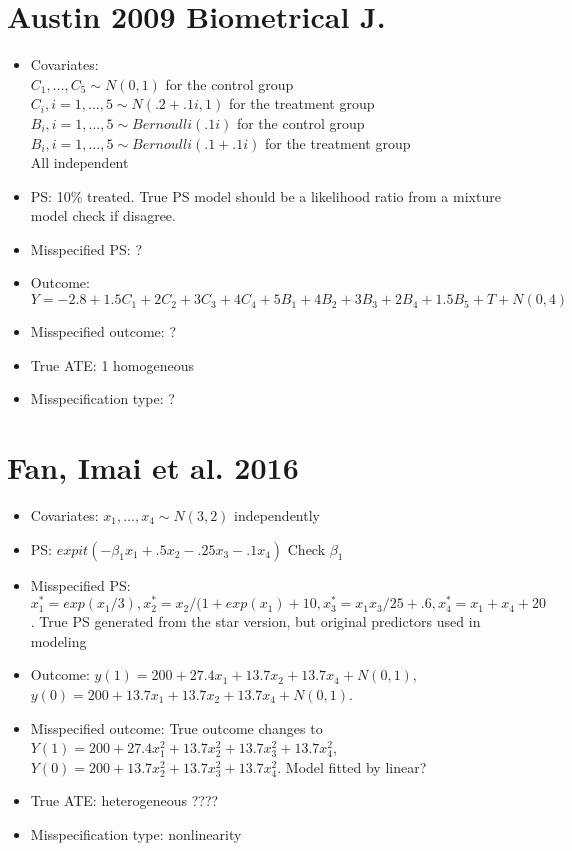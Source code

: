 \documentclass{article}
\begin{document}
\section{Austin 2009 Biometrical J.}
\begin{itemize}
\item Covariates:\\
$C_1, \ldots, C_5 \sim N(0, 1)$ for the control group\\
$C_i, i=1,\ldots,5 \sim N(.2+.1i, 1)$ for the treatment group\\
$B_i, i=1,\ldots,5 \sim Bernoulli(.1i)$ for the control group\\
$B_i, i=1,\ldots,5 \sim Bernoulli(.1 + .1i)$ for the treatment group\\
All independent
\item PS:  10\% treated. True PS model should be a likelihood ratio from a mixture model {\color{red} check if disagree}.
\item Misspecified PS: {\color{red} ?}
\item Outcome: $Y=-2.8 +  1.5C_1 + 2C_2 +3C_3 +4C_4 +5B_1 +4B_2 + 3B_3 + 2B_4 +1.5B_5 + T + N(0, 4)$
\item Misspecified outcome:  {\color{red} ?}
\item True ATE: 1 homogeneous 
\item Misspecification type:   {\color{red} ?}
\end{itemize}

\section{Fan, Imai et al. 2016}
\begin{itemize}
\item Covariates: $x_1, \ldots, x_4 \sim N(3, 2)$ independently
\item PS: $expit(-\beta_1 x_1 +.5x_2 -.25x_3 -.1x_4)$ {\color{red} Check $\beta_1$}
\item Misspecified PS:  $x_1^* = exp(x_1/3), x_2^*=x_2/(1+exp(x_1)+10, x_3^*=x_1x_3/25 + .6, x_4^* = x_1 +x_4 + 20$.  True PS generated from the star version, but original predictors used in modeling
\item Outcome: $y(1) = 200 + 27.4 x_1 + 13.7 x_2 + 13.7x_4 + N(0,1)$,
$y(0) =200 + 13.7 x_1 + 13.7 x_2 + 13.7x_4 + N(0,1)$.
\item Misspecified outcome: True outcome changes to 
$Y(1) = 200 + 27.4x_1^2 + 13.7x_2^2 + 13.7x_3^2+ 13.7x_4^2$, $Y(0) =200 + 13.7x_2^2 + 13.7x_3^2+ 13.7x_4^2$.  {\color{red}Model fitted by linear?}
\item True ATE: heterogeneous {\color{red} ????}
\item Misspecification type:  nonlinearity
\end{itemize}
\end{document}
